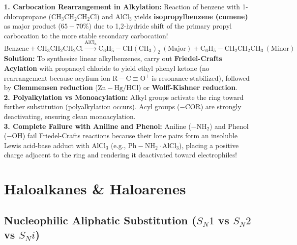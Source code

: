 \documentclass[10pt,a4paper]{article}
\begin{document}
\begin{trapbox}
\textbf{1. Carbocation Rearrangement in Alkylation:} Reaction of benzene with 1-chloropropane ($\mathrm{CH_3CH_2CH_2Cl}$) and $\mathrm{AlCl_3}$ yields \textbf{isopropylbenzene (cumene)} as major product ($65-70\%$) due to 1,2-hydride shift of the primary propyl carbocation to the more stable secondary carbocation!
\begin{equation}
  \text{Benzene} + \mathrm{CH_3CH_2CH_2Cl} \xrightarrow{\mathrm{AlCl_3}} \mathrm{C_6H_5-CH(CH_3)_2} \ (\text{Major}) + \mathrm{C_6H_5-CH_2CH_2CH_3} \ (\text{Minor})
\end{equation}
\textbf{Solution:} To synthesize linear alkylbenzenes, carry out \textbf{Friedel-Crafts Acylation} with propanoyl chloride to yield ethyl phenyl ketone (no rearrangement because acylium ion $\mathrm{R-C\equiv O^+}$ is resonance-stabilized), followed by \textbf{Clemmensen reduction} ($\mathrm{Zn-Hg / HCl}$) or \textbf{Wolff-Kishner reduction}.\\
\textbf{2. Polyalkylation vs Monoacylation:} Alkyl groups activate the ring toward further substitution (polyalkylation occurs). Acyl groups ($-\mathrm{COR}$) are strongly deactivating, ensuring clean monoacylation.\\
\textbf{3. Complete Failure with Aniline and Phenol:} Aniline ($\mathrm{-NH_2}$) and Phenol ($\mathrm{-OH}$) fail Friedel-Crafts reactions because their lone pairs form an insoluble Lewis acid-base adduct with $\mathrm{AlCl_3}$ (e.g., $\mathrm{Ph-NH_2\cdot AlCl_3}$), placing a positive charge adjacent to the ring and rendering it deactivated toward electrophiles!
\end{trapbox}

\section{Haloalkanes \& Haloarenes}

\subsection{Nucleophilic Aliphatic Substitution (\texorpdfstring{$S_N1$}{SN1} vs \texorpdfstring{$S_N2$}{SN2} vs \texorpdfstring{$S_Ni$}{SNi})}
\end{document}
